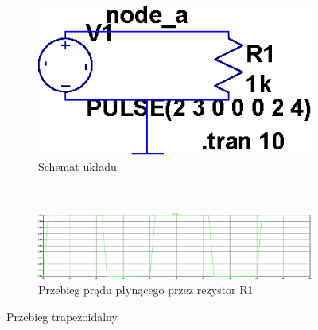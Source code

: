 \documentclass[polish,polish,a4paper]{article}
\begin{document}
\begin{figure}[H]
    \centering
    
    \begin{subfigure}[b]{0.28\textwidth}
    	\centering
        \includegraphics[width=\textwidth]{draft3uklad.eps}
        \caption{Schemat układu}
    \end{subfigure}
    ~
     \begin{subfigure}[b]{0.4\textwidth}
     	\centering
         \includegraphics[width=\textwidth]{draft3.eps}
         \caption{Przebieg prądu płynącego przez rezystor R1}
     \end{subfigure}
     \caption{Przebieg trapezoidalny}
\end{figure}
\end{document}
